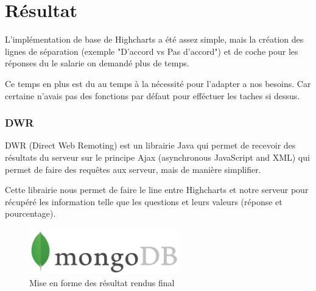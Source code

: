 \section{Résultat}

L'implémentation de base de Highcharts a été assez simple, mais la création des lignes de séparation (exemple "D'accord vs Pas d'accord") et de coche pour les réponses du le salarie on demandé plus de temps. 

Ce temps en plus est du au temps à la nécessité pour l'adapter a nos besoins. Car certaine n'avais pas des fonctions par défaut pour efféctuer les taches si dessus.

\subsubsection{DWR}

DWR (Direct Web Remoting) est un librairie Java qui permet de recevoir des résultats du serveur sur le principe Ajax (asynchronous JavaScript and XML) qui permet de faire des requêtes aux serveur, mais de manière simplifier.

Cette librairie nous permet de faire le line entre Highcharts et notre serveur pour récupéré les information telle que les questions et leurs valeurs (réponse et pourcentage).

\begin{figure}[H]
    \begin{center}
    \includegraphics[height=2.0cm]{img/mongodb}
    \end{center}
    \caption{Mise en forme des résultat rendus final}
\end{figure}